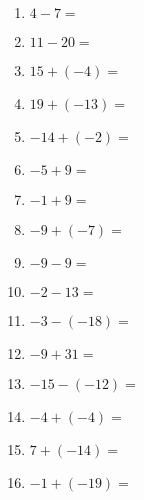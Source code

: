 \documentclass[12pt,letterpaper]{article}
\author{Shawn Ma}
\date{\today}
\begin{document}
\setlength{\parindent}{0pt}

\begin{large}
    \begin{multicols}{2}
    \begin{enumerate}
        \item $4-7=$
        \item $11-20=$
        \item $15+(-4)=$
        \item $19+(-13)=$
        \item $-14+(-2)=$
        \item $-5+9=$
        \item $-1+9=$
        \item $-9+(-7)=$
        \item $-9-9=$
        \item $-2-13=$
        \item $-3-(-18)=$
        \item $-9+31=$
        \item $-15-(-12)=$
        \item $-4+(-4)=$
        \item $7+(-14)=$
        \item $-1+(-19)=$
    \end{enumerate}
    \end{multicols}

\end{large}
\end{document}
